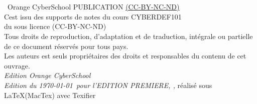 


\newpage

~\vfill
\thispagestyle{empty}

\INFOGitHubS

\noindent {\Huge\ccbyncndeu}\\ 

\noindent \the\year~Orange CyberSchool PUBLICATION \href{https://creativecommons.org/licenses/by-nc-nd/2.0/fr/}{(CC-BY-NC-ND)}\\ %

\noindent C\edoc est issu des supports de notes du cours CYBERDEF101\\ 
du \uUniversity  sous licence (CC-BY-NC-ND)\\






\noindent Tous droits de reproduction, d’adaptation et de traduction, intégrale ou partielle de ce document réservés pour tous pays.\\

\noindent Les auteurs est seuls propriétaires des droits et responsables du contenu de cet ouvrage.\\

\noindent \textit{Edition Orange CyberSchool} \\

\noindent \textit{Edition du \today~pour l'EDITION PREMIERE,  \printer, } réalisé sous \LaTeX (MacTex) avec Texifier \faApple


